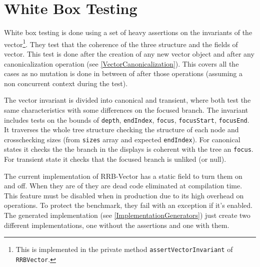 \section{White Box Testing}
\label{InvariantAssertions}
White box testing is done using a set of heavy assertions on the invariants of the vector\footnote{This is implemented in the private method \texttt{assertVectorInvariant} of \texttt{RRBVector}.}. They test that the coherence of the three structure and the fields of vector. This test is done after the creation of any new vector object and after any canonicalization operation (see \ref{VectorCanonicalization}). This covers all the cases as no mutation is done in between of after those operations (assuming a non concurrent context during the test). 

The vector invariant is divided into canonical and transient, where both test the same characteristics with some differences on the focused branch. The invariant includes tests on the bounds of \texttt{depth}, \texttt{endIndex}, \texttt{focus}, \texttt{focusStart}, \texttt{focusEnd}. It traverses the whole tree structure checking the structure of each node and crosschecking sizes (from \texttt{sizes} array and expected \texttt{endIndex}). For canonical states it checks the the branch in the displays is coherent with the tree an \texttt{focus}. For transient state it checks that the focused branch is unliked (or null). 

The current implementation of RRB-Vector has a static  field to turn them on and off. When they are of they are dead code eliminated at compilation time. This feature must be disabled when in production due to its high overhead on operations. To protect the benchmark, they fail with an exception if it's enabled. The generated implementation (see \ref{ImplementationGenerators}) just create two different implementations, one without the assertions and one with them.


